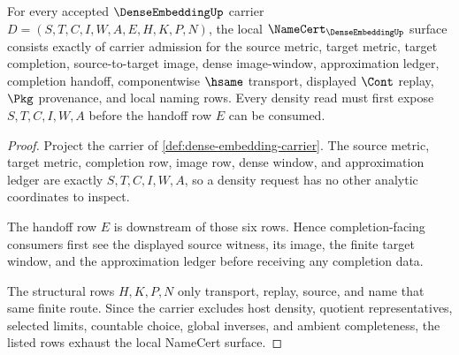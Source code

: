 \begin{theorem}\label{thm:dense-embedding-namecert-obligations}
For every accepted $\DenseEmbeddingUp$ carrier $D=(S,T,C,I,W,A,E,H,K,P,N)$, the local $\NameCert_{\DenseEmbeddingUp}$ surface consists exactly of carrier admission for the source metric, target metric, target completion, source-to-target image, dense image-window, approximation ledger, completion handoff, componentwise $\hsame$ transport, displayed $\Cont$ replay, $\Pkg$ provenance, and local naming rows. Every density read must first expose $S,T,C,I,W,A$ before the handoff row $E$ can be consumed.
\end{theorem}
\begin{proof}
Project the carrier of \autoref{def:dense-embedding-carrier}. The source metric, target metric, completion row, image row, dense window, and approximation ledger are exactly $S,T,C,I,W,A$, so a density request has no other analytic coordinates to inspect.

The handoff row $E$ is downstream of those six rows. Hence completion-facing consumers first see the displayed source witness, its image, the finite target window, and the approximation ledger before receiving any completion data.

The structural rows $H,K,P,N$ only transport, replay, source, and name that same finite route. Since the carrier excludes host density, quotient representatives, selected limits, countable choice, global inverses, and ambient completeness, the listed rows exhaust the local NameCert surface.
\end{proof}


